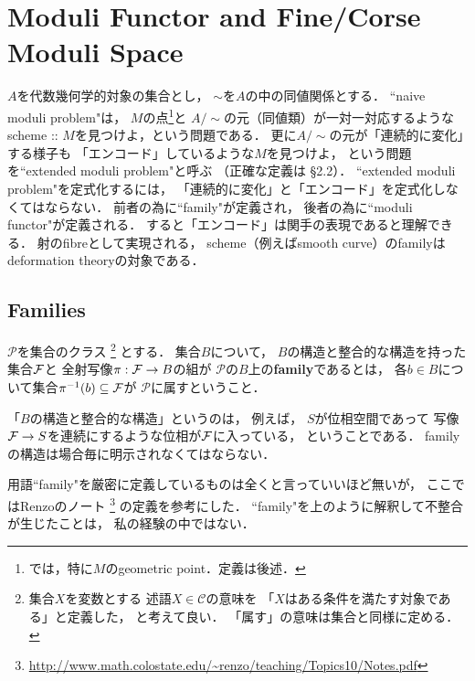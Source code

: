 \documentclass[a4paper]{jsarticle}
\begin{document}
\section{Moduli Functor and Fine/Corse Moduli Space}
    $A$を代数幾何学的対象の集合とし，
    $\sim$を$A$の中の同値関係とする．
    ``naive moduli problem"は，
    $M$の点\footnote{ \cite{GIT}では，特に$M$のgeometric point．定義は後述． }と
    $A/\sim$の元（同値類）が一対一対応するような
    scheme :: $M$を見つけよ，という問題である．
    更に$A/\sim$の元が「連続的に変化」する様子も
    「エンコード」しているような$M$を見つけよ，
    という問題を``extended moduli problem"と呼ぶ
    （正確な定義は\cite{Hos} \S 2.2）．
    ``extended moduli problem"を定式化するには，
    「連続的に変化」と「エンコード」を定式化しなくてはならない．
    前者の為に``family"が定義され，
    後者の為に``moduli functor"が定義される．
    すると「エンコード」は関手の表現であると理解できる．
        射のfibreとして実現される，
        scheme（例えばsmooth curve）のfamilyは
        deformation theoryの対象である．

    \subsection{Families}
    \begin{Def}
        $\mathcal{P}$を集合のクラス
        \footnote
        {
            集合$X$を変数とする
            述語$X \in \mathcal{C}$の意味を
            「$X$はある条件を満たす対象である」と定義した，
            と考えて良い．
            「属す」の意味は集合と同様に定める．
        }
        とする．
        集合$B$について，
        $B$の構造と整合的な構造を持った集合$\mathcal{F}$と
        全射写像$\pi: \mathcal{F} \to B$の組が
        $\mathcal{P}$の$B$上の\textbf{family}であるとは，
        各$b \in B$について集合$\pi^{-1}(b) \subseteq \mathcal{F}$が
        $\mathcal{P}$に属すということ．
    \end{Def}
    「$B$の構造と整合的な構造」というのは，
    例えば，
    $S$が位相空間であって
    写像$\mathcal{F} \to S$を連続にするような位相が$\mathcal{F}$に入っている，
    ということである．
    familyの構造は場合毎に明示されなくてはならない．

    用語``family"を厳密に定義しているものは全くと言っていいほど無いが，
    ここではRenzoのノート
    \footnote{ \url{http://www.math.colostate.edu/~renzo/teaching/Topics10/Notes.pdf} }
    の定義を参考にした．
    ``family"を上のように解釈して不整合が生じたことは，
    私の経験の中ではない．
\end{document}
